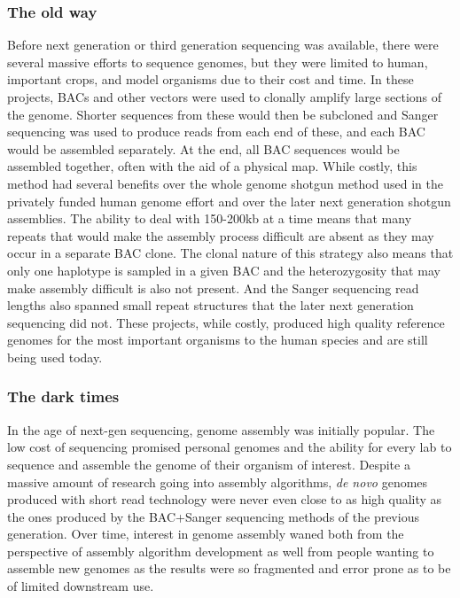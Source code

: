 \subsubsection{The old way}

\par{
Before next generation or third generation sequencing was available, there were several massive efforts to sequence genomes, but they were limited to human, important crops, and model organisms due to their cost and time\cite{genomeproject}\cite{mousegenome}\cite{maizegenome}. In these projects, BACs and other vectors were used to clonally amplify large sections of the genome. Shorter sequences from these would then be subcloned and Sanger sequencing was used to produce reads from each end of these, and each BAC would be assembled separately. At the end, all BAC sequences would be assembled together, often with the aid of a physical map. While costly, this method had several benefits over the whole genome shotgun method used in the privately funded human genome effort and over the later next generation shotgun assemblies. The ability to deal with 150-200kb at a time means that many repeats that would make the assembly process difficult are absent as they may occur in a separate BAC clone. The clonal nature of this strategy also means that only one haplotype is sampled in a given BAC and the heterozygosity that may make assembly difficult is also not present. And the Sanger sequencing read lengths also spanned small repeat structures that the later next generation sequencing did not. These projects, while costly, produced high quality reference genomes for the most important organisms to the human species and are still being used today.
}

\subsubsection{The dark times}

\par{
In the age of next-gen sequencing, genome assembly was initially popular. The low cost of sequencing promised personal genomes and the ability for every lab to sequence and assemble the genome of their organism of interest. Despite a massive amount of research going into assembly algorithms, \textit{de novo} genomes produced with short read technology were never even close to as high quality as the ones produced by the BAC+Sanger sequencing methods of the previous generation\cite{illuminashit}\cite{gage}. Over time, interest in genome assembly waned both from the perspective of assembly algorithm development as well from people wanting to assemble new genomes as the results were so fragmented and error prone as to be of limited downstream use\cite{assemblethon}.
}

